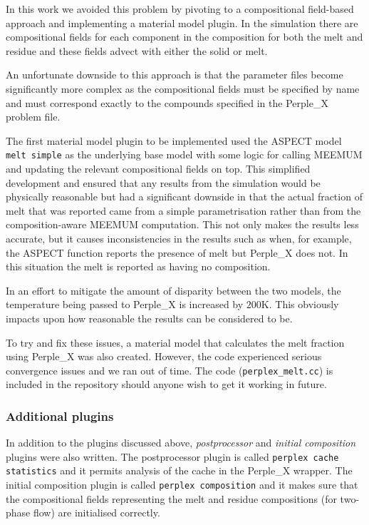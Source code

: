 In this work we avoided this problem by pivoting to a compositional field-based approach and implementing a material model plugin.
In the simulation there are compositional fields for each component in the composition for both the melt and residue and these fields advect with either the solid or melt.

An unfortunate downside to this approach is that the parameter files become significantly more complex as the compositional fields must be specified by name and must correspond exactly to the compounds specified in the Perple\_X problem file.

The first material model plugin to be implemented used the ASPECT model \texttt{melt simple} as the underlying base model with some logic for calling MEEMUM and updating the relevant compositional fields on top.
This simplified development and ensured that any results from the simulation would be physically reasonable but had a significant downside in that the actual fraction of melt that was reported came from a simple parametrisation rather than from the composition-aware MEEMUM computation.
This not only makes the results less accurate, but it causes inconsistencies in the results such as when, for example, the ASPECT function reports the presence of melt but Perple\_X does not. 
In this situation the melt is reported as having no composition.

In an effort to mitigate the amount of disparity between the two models, the temperature being passed to Perple\_X is increased by $200 \mathrm{K}$.
This obviously impacts upon how reasonable the results can be considered to be.

To try and fix these issues, a material model that calculates the melt fraction using Perple\_X was also created.
However, the code experienced serious convergence issues and we ran out of time.
The code (\texttt{perplex\_melt.cc}) is included in the repository should anyone wish to get it working in future.

\subsubsection{Additional plugins}

In addition to the plugins discussed above, \textit{postprocessor} and \textit{initial composition} plugins were also written.
The postprocessor plugin is called \texttt{perplex cache statistics} and it permits analysis of the cache in the Perple\_X wrapper.
The initial composition plugin is called \texttt{perplex composition} and it makes sure that the compositional fields representing the melt and residue compositions (for two-phase flow) are initialised correctly.

